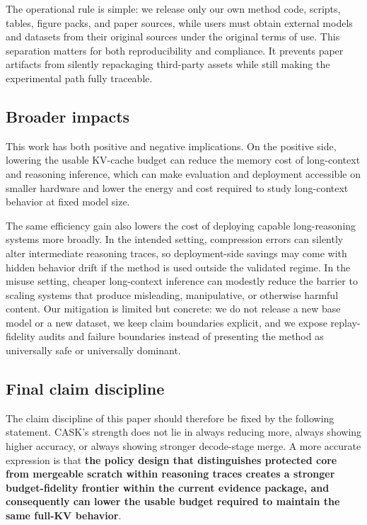 The operational rule is simple: we release only our own method code, scripts, tables, figure packs, and paper sources, while users must obtain external models and datasets from their original sources under the original terms of use. This separation matters for both reproducibility and compliance. It prevents paper artifacts from silently repackaging third-party assets while still making the experimental path fully traceable.


\subsection{Broader impacts}


This work has both positive and negative implications. On the positive side, lowering the usable KV-cache budget can reduce the memory cost of long-context and reasoning inference, which can make evaluation and deployment accessible on smaller hardware and lower the energy and cost required to study long-context behavior at fixed model size.


The same efficiency gain also lowers the cost of deploying capable long-reasoning systems more broadly. In the intended setting, compression errors can silently alter intermediate reasoning traces, so deployment-side savings may come with hidden behavior drift if the method is used outside the validated regime. In the misuse setting, cheaper long-context inference can modestly reduce the barrier to scaling systems that produce misleading, manipulative, or otherwise harmful content. Our mitigation is limited but concrete: we do not release a new base model or a new dataset, we keep claim boundaries explicit, and we expose replay-fidelity audits and failure boundaries instead of presenting the method as universally safe or universally dominant.


\subsection{Final claim discipline}


The claim discipline of this paper should therefore be fixed by the following statement. CASK's strength does not lie in always reducing more, always showing higher accuracy, or always showing stronger decode-stage merge. A more accurate expression is that \textbf{the policy design that distinguishes protected core from mergeable scratch within reasoning traces creates a stronger budget-fidelity frontier within the current evidence package, and consequently can lower the usable budget required to maintain the same full-KV behavior}.


